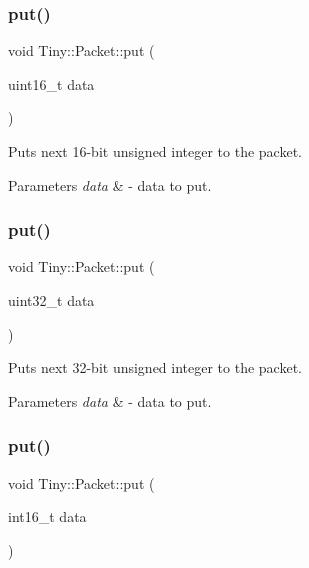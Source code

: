 \subsubsection{\texorpdfstring{put()}{put()}\hspace{0.1cm}{\footnotesize\ttfamily [3/7]}}
{\footnotesize\ttfamily void Tiny\+::\+Packet\+::put (\begin{DoxyParamCaption}\item[{uint16\+\_\+t}]{data }\end{DoxyParamCaption})\hspace{0.3cm}{\ttfamily [inline]}}

Puts next 16-\/bit unsigned integer to the packet. 
\begin{DoxyParams}{Parameters}
{\em data} & -\/ data to put. \\
\hline
\end{DoxyParams}
\mbox{\label{classTiny_1_1Packet_aed30fc087142669b37ec99d9d6572e57}} 
\subsubsection{\texorpdfstring{put()}{put()}\hspace{0.1cm}{\footnotesize\ttfamily [4/7]}}
{\footnotesize\ttfamily void Tiny\+::\+Packet\+::put (\begin{DoxyParamCaption}\item[{uint32\+\_\+t}]{data }\end{DoxyParamCaption})\hspace{0.3cm}{\ttfamily [inline]}}

Puts next 32-\/bit unsigned integer to the packet. 
\begin{DoxyParams}{Parameters}
{\em data} & -\/ data to put. \\
\hline
\end{DoxyParams}
\mbox{\label{classTiny_1_1Packet_a464ddc51642812e604ac39f775762165}} 
\subsubsection{\texorpdfstring{put()}{put()}\hspace{0.1cm}{\footnotesize\ttfamily [5/7]}}
{\footnotesize\ttfamily void Tiny\+::\+Packet\+::put (\begin{DoxyParamCaption}\item[{int16\+\_\+t}]{data }\end{DoxyParamCaption})\hspace{0.3cm}{\ttfamily [inline]}}

